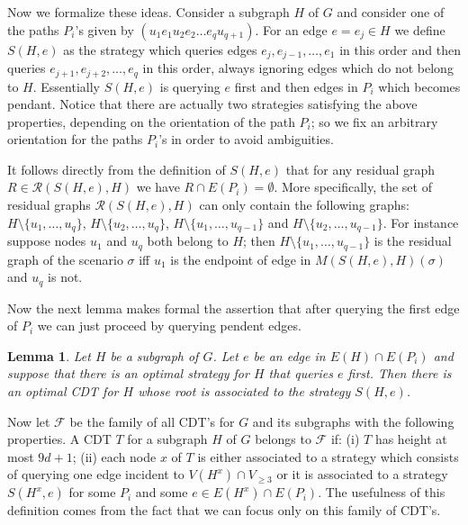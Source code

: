 \documentclass[12pt]{article}
\newtheorem{lemma}{Lemma}
\newcommand{\Mf}[2]{M(#1,#2)}
\begin{document}
	Now we formalize these ideas. Consider a subgraph $H$ of $G$ and consider one of the paths $P_i$'s  given by $(u_1 e_1 u_2 e_2 \ldots e_q u_{q+1})$. For an edge $e = e_j \in H$ we define $S(H, e)$ as the strategy which queries edges $e_j, e_{j-1}, \ldots, e_1$ in this order and then queries $e_{j + 1}, e_{j + 2}, \ldots, e_q$ in this order, always ignoring edges which do not belong to $H$. Essentially $S(H, e)$ is querying $e$ first and then edges in $P_i$ which becomes pendant. Notice that there are actually two strategies satisfying the above properties, depending on the orientation of the path $P_i$; so we fix an arbitrary orientation for the paths $P_i$'s in order to avoid ambiguities. 
	
	It follows directly from the definition of $S(H, e)$ that for any residual graph $R \in \mathcal{R}(S(H, e), H)$ we have $R \cap E(P_i) = \emptyset$. More specifically, the set of residual graphs $\mathcal{R}(S(H, e), H)$ can only contain the following graphs: $H \setminus \{u_1, \ldots, u_q\}$, $H \setminus \{u_2, \ldots, u_q\}$, $H \setminus \{u_1, \ldots, u_{q - 1}\}$ and $H \setminus \{u_2, \ldots, u_{q - 1}\}$. For instance suppose nodes $u_1$ and $u_q$ both belong to $H$; then $H \setminus \{u_1, \ldots, u_{q - 1}\}$ is the residual graph of the scenario $\sigma$ iff $u_1$ is the endpoint of edge in $\Mf{S(H, e)}{H}(\sigma)$ and $u_q$ is not. 
	
	Now the next lemma makes formal the assertion that after querying the first edge of $P_i$ we can just proceed by querying pendent edges.
	
	\begin{lemma} \label{mainLemmaSparse}
		Let $H$ be a subgraph of $G$. Let $e$ be an edge in $E(H) \cap E(P_i)$ and suppose that there is an optimal strategy for $H$ that queries $e$ first. Then there is an optimal CDT for $H$ whose root is associated to the strategy $S(H, e)$.
	\end{lemma}		

		Now let $\mathcal{F}$ be the family of all CDT's for $G$ and its subgraphs with the following properties. A CDT $T$ for a subgraph $H$ of $G$ belongs to $\mathcal{F}$ if: (i) $T$ has height at most $9d + 1$; (ii) each node $x$ of $T$ is either associated to a strategy which consists of querying one edge incident to $V(H^x) \cap V_{\ge 3}$ or it is associated to a strategy $S(H^x, e)$ for some $P_i$ and some $e \in E(H^x) \cap E(P_i)$. The usefulness of this definition comes from the fact that we can focus only on this family of CDT's.
		
\end{document}
